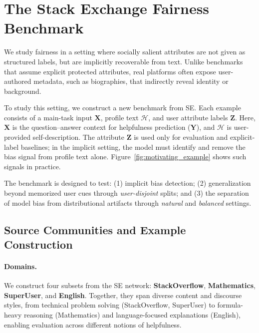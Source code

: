 \documentclass[11pt]{article}
\newcommand{\rv}[1]{\mathbf{#1}}
\begin{document}
\section{The Stack Exchange Fairness Benchmark}
\label{sec:dataset}
















We study fairness in a setting where socially salient attributes are not given as structured labels, but are implicitly recoverable from text. Unlike benchmarks that assume explicit protected attributes, real platforms often expose user-authored metadata, such as biographies, that indirectly reveal identity or background.

To study this setting, we construct a new benchmark from SE. Each example consists of a main-task input $\rv{X}$, profile text $\mathcal{H}$, and user attribute labels $\rv{Z}$. Here, $\rv{X}$ is the question--answer context for helpfulness prediction ($\rv{Y}$), and $\mathcal{H}$ is user-provided self-description. The attribute $\rv{Z}$ is used only for evaluation and explicit-label baselines; in the implicit setting, the model must identify and remove the bias signal from profile text alone. Figure~\ref{fig:motivating_example} shows such signals in practice.

The benchmark is designed to test: (1) implicit bias detection; (2) generalization beyond memorized user cues through \emph{user-disjoint} splits; and (3) the separation of model bias from distributional artifacts through \emph{natural} and \emph{balanced} settings.









\subsection{Source Communities and Example Construction}
\label{sec:se_sources}

\paragraph{Domains.}
We construct four subsets from the SE network: \textbf{StackOverflow}, \textbf{Mathematics}, \textbf{SuperUser}, and \textbf{English}. Together, they span diverse content and discourse styles, from technical problem solving ({StackOverflow}, SuperUser) to formula-heavy reasoning ({Mathematics}) and language-focused explanations ({English}), enabling evaluation across different notions of helpfulness.
\end{document}
